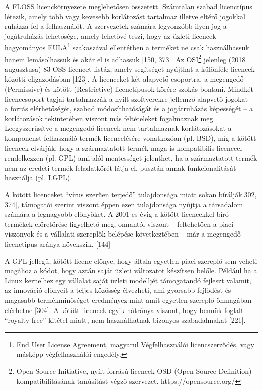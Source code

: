 \documentclass[12pt,magyar,a4paper,oneside]{scrreprt}
\begin{document}
A FLOSS licenckörnyezete meglehetősen összetett. Számtalan szabad
licenctípus létezik, amely több vagy kevesebb korlátozást tartalmaz
illetve eltérő jogokkal ruházza fel a felhasználót. A szervezetek
számára legvonzóbb ilyen jog a jogátruházás lehetősége, amely lehetővé
teszi, hogy az üzleti licencek hagyományos EULA\footnote{End User
  License Agreement, magyarul Végfelhasználói licencszerződés, vagy
  másképp végfelhasználói engedély.} szakaszával ellentétben a terméket
ne csak használhassuk hanem lemásolhassuk és akár el is adhassuk {[}150,
373{]}. Az OSI\footnote{Open Source Initiative, nyílt forrású licencek
  OSD (Open Source Definition) kompatibilitásának tanúsítást végző
  szervezet. https://opensource.org/} jelenleg (2018 augusztusa) 83 OSS
licencet listáz, amely segítséget nyújthat a különféle licencek közötti
eligazodásban {[}123{]}. A licenceket két alapvető csoportra, a
megengedő (Permissive) és kötött (Restrictive) licenctípusok körére
szokás bontani. Mindkét licenccsoport tagjai tartalmazzák a nyílt
szoftverekre jellemző alapvető jogokat -- a forrás elérhetőségét, szabad
módosíthatóságát és a jogátruházás képességét -- a korlátozások
tekintetében viszont más feltételeket fogalmaznak meg. Leegyszerűsítve a
megengedő licencek nem tartalmaznak korlátozásokat a komponenst
felhasználó termék licencelésére vonatkozóan (pl. BSD), míg a kötött
licencek elvárják, hogy a származtatott termék maga is kompatibilis
licenccel rendelkezzen (pl. GPL) ami alól mentességet jelenthet, ha a
származtatott termék nem az eredeti termék feladatkörét látja el,
pusztán annak funkcionalitását használja (pl. LGPL).

A kötött licenceket ``vírus szerűen terjedő'' tulajdonsága miatt sokan
bírálják{[}302, 374{]}, támogatói szerint viszont éppen ezen
tulajdonsága nyújtja a társadalom számára a legnagyobb előnyöket. A
2001-es évig a kötött licencekkel bíró termékek előretörése figyelhető
meg, onnantól viszont -- feltehetően a piaci viszonyok és a vállalati
szereplők belépése következtében -- már a megengedő licenctipus aránya
növekszik. {[}144{]}

A GPL jellegű, kötött licenc előnye, hogy általa egyetlen piaci szereplő
sem veheti magához a kódot, hogy aztán saját üzleti változatot készítsen
belőle. Például ha a Linux kernelhez egy vállalat saját üzleti modelljét
támogatandó fejleszt valamit, az innováció előnyeit a teljes közösség
élvezheti, ami gyorsabb fejlődést és magasabb termékminőséget eredményez
mint amit egyetlen szereplő önmagában elérhetne {[}304{]}. A kötött
licencek egyik hátránya viszont, hogy bennük foglalt ``royalty-free''
kitétel miatt, nem használhatnak bizonyos szabadalmakat {[}221{]}.
\end{document}
